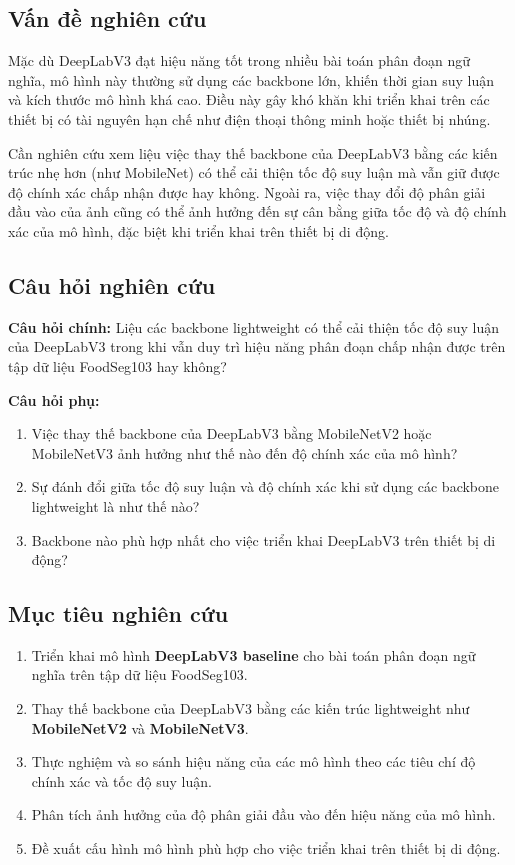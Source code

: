 \subsection{Vấn đề nghiên cứu}

Mặc dù DeepLabV3 đạt hiệu năng tốt trong nhiều bài toán phân đoạn ngữ nghĩa, mô hình này thường sử dụng các backbone lớn, khiến thời gian suy luận và kích thước mô hình khá cao. Điều này gây khó khăn khi triển khai trên các thiết bị có tài nguyên hạn chế như điện thoại thông minh hoặc thiết bị nhúng.

Cần nghiên cứu xem liệu việc thay thế backbone của DeepLabV3 bằng các kiến trúc nhẹ hơn (như MobileNet) có thể cải thiện tốc độ suy luận mà vẫn giữ được độ chính xác chấp nhận được hay không. Ngoài ra, việc thay đổi độ phân giải đầu vào của ảnh cũng có thể ảnh hưởng đến sự cân bằng giữa tốc độ và độ chính xác của mô hình, đặc biệt khi triển khai trên thiết bị di động.

\subsection{Câu hỏi nghiên cứu}

\textbf{Câu hỏi chính:} Liệu các backbone lightweight có thể cải thiện tốc độ suy luận của DeepLabV3 trong khi vẫn duy trì hiệu năng phân đoạn chấp nhận được trên tập dữ liệu FoodSeg103 hay không?

\textbf{Câu hỏi phụ:}
\begin{enumerate}
    \item Việc thay thế backbone của DeepLabV3 bằng MobileNetV2 hoặc MobileNetV3 ảnh hưởng như thế nào đến độ chính xác của mô hình?
    \item Sự đánh đổi giữa tốc độ suy luận và độ chính xác khi sử dụng các backbone lightweight là như thế nào?
    \item Backbone nào phù hợp nhất cho việc triển khai DeepLabV3 trên thiết bị di động?
\end{enumerate}

\subsection{Mục tiêu nghiên cứu}

\begin{enumerate}
    \item Triển khai mô hình \textbf{DeepLabV3 baseline} cho bài toán phân đoạn ngữ nghĩa trên tập dữ liệu FoodSeg103.
    \item Thay thế backbone của DeepLabV3 bằng các kiến trúc lightweight như \textbf{MobileNetV2} và \textbf{MobileNetV3}.
    \item Thực nghiệm và so sánh hiệu năng của các mô hình theo các tiêu chí độ chính xác và tốc độ suy luận.
    \item Phân tích ảnh hưởng của độ phân giải đầu vào đến hiệu năng của mô hình.
    \item Đề xuất cấu hình mô hình phù hợp cho việc triển khai trên thiết bị di động.
\end{enumerate}

